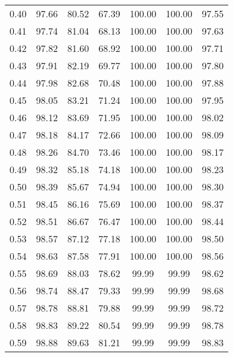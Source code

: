 \begin{tabular}{|c|c|c|c|c|c|c|}
      0.40 &     97.66 &     80.52 &      67.39 &  100.00 &     100.00 &         97.55 \\
      0.41 &     97.74 &     81.04 &      68.13 &  100.00 &     100.00 &         97.63 \\
      0.42 &     97.82 &     81.60 &      68.92 &  100.00 &     100.00 &         97.71 \\
      0.43 &     97.91 &     82.19 &      69.77 &  100.00 &     100.00 &         97.80 \\
      0.44 &     97.98 &     82.68 &      70.48 &  100.00 &     100.00 &         97.88 \\
      0.45 &     98.05 &     83.21 &      71.24 &  100.00 &     100.00 &         97.95 \\
      0.46 &     98.12 &     83.69 &      71.95 &  100.00 &     100.00 &         98.02 \\
      0.47 &     98.18 &     84.17 &      72.66 &  100.00 &     100.00 &         98.09 \\
      0.48 &     98.26 &     84.70 &      73.46 &  100.00 &     100.00 &         98.17 \\
      0.49 &     98.32 &     85.18 &      74.18 &  100.00 &     100.00 &         98.23 \\
      0.50 &     98.39 &     85.67 &      74.94 &  100.00 &     100.00 &         98.30 \\
      0.51 &     98.45 &     86.16 &      75.69 &  100.00 &     100.00 &         98.37 \\
      0.52 &     98.51 &     86.67 &      76.47 &  100.00 &     100.00 &         98.44 \\
      0.53 &     98.57 &     87.12 &      77.18 &  100.00 &     100.00 &         98.50 \\
      0.54 &     98.63 &     87.58 &      77.91 &  100.00 &     100.00 &         98.56 \\
      0.55 &     98.69 &     88.03 &      78.62 &   99.99 &      99.99 &         98.62 \\
      0.56 &     98.74 &     88.47 &      79.33 &   99.99 &      99.99 &         98.68 \\
      0.57 &     98.78 &     88.81 &      79.88 &   99.99 &      99.99 &         98.72 \\
      0.58 &     98.83 &     89.22 &      80.54 &   99.99 &      99.99 &         98.78 \\
      0.59 &     98.88 &     89.63 &      81.21 &   99.99 &      99.99 &         98.83 \\

\end{tabular}
